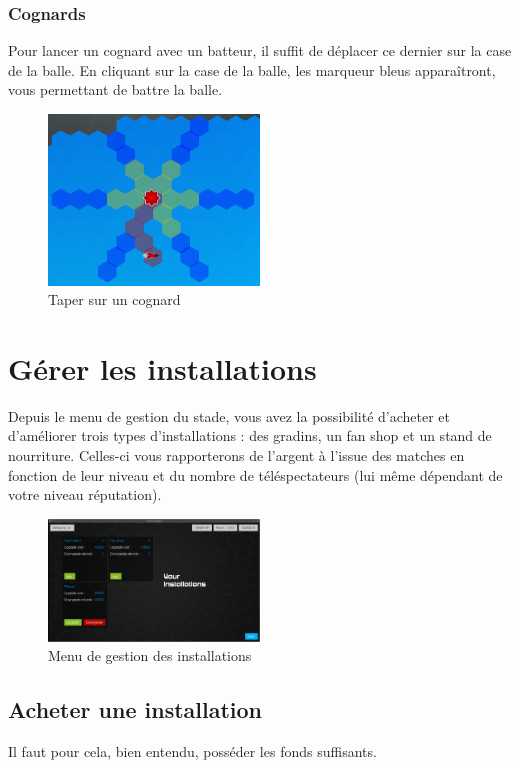 \subsubsection{Cognards}
Pour lancer un cognard avec un batteur, il suffit de déplacer ce dernier sur la case de la balle. En cliquant sur la case de la balle, les marqueur bleus apparaîtront, vous permettant de battre la balle.

\begin{figure}[h!]
    \centering
    \includegraphics[width=0.5\textwidth]{../screenshots/throw_bludger.png}
    \caption{\label{manual:throw_bludger} Taper sur un cognard}
\end{figure}

\section{Gérer les installations}
Depuis le menu de gestion du stade, vous avez la possibilité d'acheter et d'améliorer trois types 
d'installations : des gradins, un fan shop et un stand de nourriture. Celles-ci vous rapporterons 
de l'argent à l'issue des matches en fonction de leur niveau et du nombre de téléspectateurs (lui
même dépendant de votre niveau réputation).

\begin{figure}[h!]
    \centering
    \includegraphics[width=0.5\textwidth]{../screenshots/installation_manager.png}
    \caption{\label{manual:installation} Menu de gestion des installations}
\end{figure}

\subsection{Acheter une installation}
Il faut pour cela, bien entendu, posséder les fonds suffisants.

